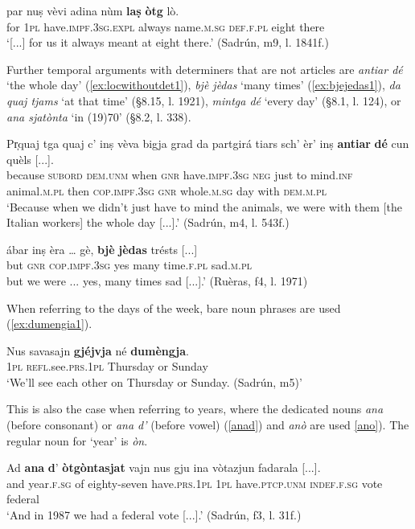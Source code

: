 \ea
\label{ex:timeofday2}
\gll [...] par nuṣ vèvi adina nùm \textbf{laṣ} \textbf{òtg} lò.   \\
{} for \textsc{1pl} have.\textsc{impf.3sg.expl} always name.\textsc{m.sg} \textsc{def.f.pl} eight there\\
\glt `[...] for us it always meant at eight there.' (Sadrún, m9, l. 1841f.)
\z

Further temporal arguments with determiners that are not articles are \textit{antiar dé} `the whole day' (\ref{ex:locwithoutdet1}), \textit{bjè jèdas} `many times' (\ref{ex:bjejedas1}), \textit{da quaj tjams} `at that time' (§8.15, l. 1921), \textit{mintga dé} `every day' (§8.1, l. 124), or \textit{ana sjatònta} `in (19)70' (§8.2, l. 338).

\ea
\label{ex:locwithoutdet1}
\gll  Pr̩quaj tga quaj c’ inṣ vèva bigja grad da partgirá tiars sch’ èr’ inṣ \textbf{antiar} \textbf{dé} cun quèls [...].  \\
because \textsc{subord} \textsc{dem.unm} when \textsc{gnr} have.\textsc{impf.3sg}  \textsc{neg} just to mind.\textsc{inf} animal.\textsc{m.pl} then \textsc{cop.impf.3sg} \textsc{gnr} whole.\textsc{m.sg} day with \textsc{dem.m.pl}\\
\glt `Because when we didn’t just have to mind the animals, we were with them [the Italian workers] the whole day [...].' (Sadrún, m4, l. 543f.)
\z

\ea
\label{ex:bjejedas1}
\gll [...] ábar inṣ èra … gè,  \textbf{bjè} \textbf{jèdas} trésts [...]\\
{} but \textsc{gnr} \textsc{cop.impf.3sg} {} yes many time.\textsc{f.pl} sad.\textsc{m.pl}\\
\glt [...] but we were ... yes, many times sad [...].' (Ruèras, f4, l. 1971)
\z

When referring to the days of the week, bare noun phrases are used (\ref{ex:dumengia1}).

\ea
\label{ex:dumengia1}
\gll Nus savasajn \textbf{gjéjvja} né \textbf{dumèngja}.\\
\textsc{1pl} \textsc{refl}.see.\textsc{prs.1pl} Thursday or Sunday\\
\glt `We'll see each other on Thursday or Sunday. (Sadrún, m5)'
\z

This is also the case when referring to years, where the dedicated nouns \textit{ana} (before consonant) or \textit{ana d'} (before vowel) (\ref{anad}) and \textit{anò} are used \ref{ano}). The regular noun for `year' is \textit{òn}.

\ea
\label{anad}
\gll Ad \textbf{ana} \textbf{d}' \textbf{òtgòntasjat} vajn nus gju ina vòtazjun fadarala [...].   \\
and year.\textsc{f.sg} of eighty-seven have.\textsc{prs.1pl} \textsc{1pl} have.\textsc{ptcp.unm} \textsc{indef.f.sg} vote federal\\
\glt `And in 1987 we had a federal vote [...].' (Sadrún, f3, l. 31f.)
\z

